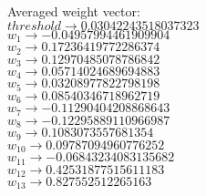 \begin{enumerate}
\begin{enumerate}
					Averaged weight vector: \\
					\( threshold \rightarrow 0.03042243518037323 \) \\
					\( w_{1} \rightarrow -0.04957994461909904 \) \\
					\( w_{2} \rightarrow 0.17236419772286374 \) \\
					\( w_{3} \rightarrow 0.12970485078786842 \) \\
					\( w_{4} \rightarrow 0.05714024689694883 \) \\
					\( w_{5} \rightarrow 0.03208977822798198 \) \\
					\( w_{6} \rightarrow 0.08540346718962719 \) \\
					\( w_{7} \rightarrow -0.11290404208868643 \) \\
					\( w_{8} \rightarrow -0.12295889110966987 \) \\
					\( w_{9} \rightarrow 0.1083073557681354 \) \\
					\( w_{10} \rightarrow 0.09787094960776252 \) \\
					\( w_{11} \rightarrow -0.06843234083135682 \) \\
					\( w_{12} \rightarrow 0.42531877515611183 \) \\
					\( w_{13} \rightarrow 0.827552512265163 \) \\ \\


\end{enumerate}
\end{enumerate}
